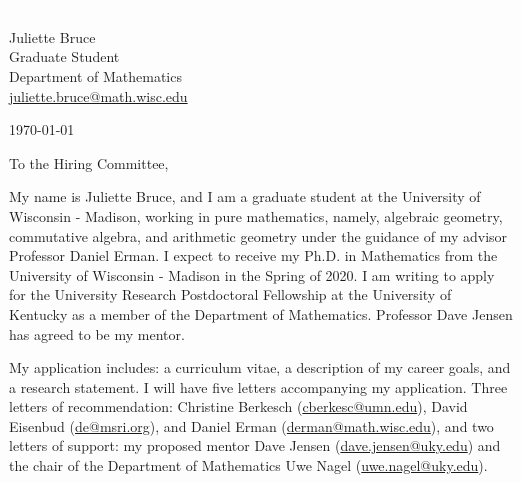 \documentclass[11pt]{article}
\begin{document}
\section*{}

\noindent
\begin{minipage}{0.99\textwidth}
\begin{minipage}{0.69\textwidth}
\textcolor{white}{.}
\end{minipage}
\begin{minipage}{0.29\textwidth}
{
Juliette Bruce \\
Graduate Student \\
Department of Mathematics \\
\href{mailto:juliette.bruce@math.wisc.edu}{juliette.bruce@math.wisc.edu}
}

\vspace{12pt}
\today
\end{minipage}
\end{minipage}


\vspace{12pt}
\noindent
To the Hiring Committee,

My name is Juliette Bruce, and I am a graduate student at the University of Wisconsin - Madison, working in pure mathematics, namely, algebraic geometry, commutative algebra, and arithmetic geometry under the guidance of my advisor Professor Daniel Erman. I expect to receive my Ph.D. in Mathematics from the University of Wisconsin - Madison in the Spring of 2020. I am writing to apply for the University Research Postdoctoral Fellowship at the University of Kentucky as a member of the Department of Mathematics. Professor Dave Jensen has agreed to be my mentor. 

My application includes:  a curriculum vitae, a description of my career goals, and a research statement. I will have five letters accompanying my application. Three letters of recommendation: Christine Berkesch (\href{mailto:cberkesc@umn.edu}{cberkesc@umn.edu}), David Eisenbud (\href{mailto:de@msri.org}{de@msri.org}), and Daniel Erman (\href{mailto:derman@math.wisc.edu}{derman@math.wisc.edu}), and two letters of support: my proposed mentor Dave Jensen (\href{dave.jensen@uky.edu}{dave.jensen@uky.edu}) and the chair of the Department of Mathematics Uwe Nagel (\href{uwe.nagel@uky.edu}{uwe.nagel@uky.edu}).
\end{document}
